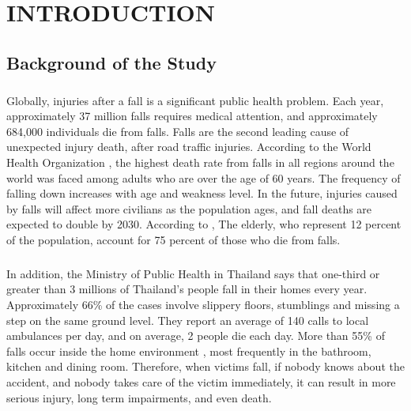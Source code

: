 \setlength{\parindent}{0in} 
\setlength{\parskip}{1em}
\setlength{\baselineskip}{1.6em}
\setlength{\parindent}{0em}              

\chapter{INTRODUCTION} 

\section{Background of the Study}
\paragraph{}
Globally, injuries after a fall is a significant public health problem. Each year, approximately 37 million falls requires medical attention, and approximately 684,000 individuals die from falls. Falls are the second leading cause of unexpected injury death, after road traffic injuries. According to the World Health Organization \cite{world_health_organization_2018}, the highest death rate from falls in all regions around the world was faced among adults who are over the age of 60 years. The frequency of falling down increases with age and weakness level. In the future, injuries caused by falls will affect more civilians as the population ages, and fall deaths are expected to double by 2030. According to \citeauthor{fuller_2013} \citeyear{fuller_2013}, The elderly, who represent 12 percent of the population, account for 75 percent of those who die from falls. 
 
 \paragraph{}
In addition, the Ministry of Public Health in Thailand \cite{thaincd.com_2019} says that one-third or greater than 3 millions of Thailand’s people fall in their homes every year. Approximately 66\% of the cases involve slippery floors, stumblings and missing a step on the same ground level. They report an average of 140 calls to local ambulances per day, and on average, 2 people die each day. More than 55\% of falls occur inside the home environment \cite{pynoos_steinman_nguyen_2010}, most frequently in the bathroom, kitchen and dining room. Therefore, when victims fall, if nobody knows about the accident, and nobody takes care of the victim immediately, it can result in more serious injury, long term impairments, and even death.

